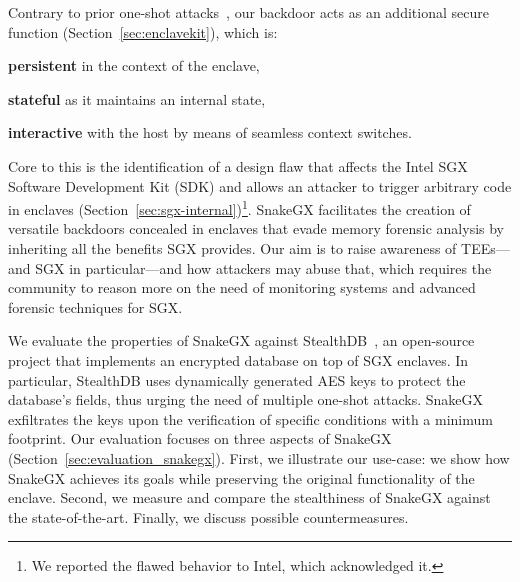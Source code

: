 Contrary to prior one-shot attacks~\cite{biondo2018guard,lee2017hacking}, our 
backdoor acts as an additional secure function (Section~\ref{sec:enclavekit}), 
which is: 
\begin{enumerate*}[label=(\roman*)]
	\item \textbf{persistent} in the context of the enclave,
	\item \textbf{stateful} as it maintains an internal state,
	\item \textbf{interactive} with the host by means of seamless context 
	switches.
\end{enumerate*}
Core to this is the identification of a design flaw that
affects the Intel SGX Software Development Kit (SDK) and allows an attacker to 
trigger arbitrary code in enclaves 
(Section~\ref{sec:sgx-internal})\footnote{We reported the flawed 
	behavior to Intel, which acknowledged it.}.
SnakeGX facilitates the creation of versatile backdoors concealed in
enclaves that evade memory forensic analysis by inheriting all the benefits SGX 
provides.
Our aim is to raise awareness of TEEs---and SGX in particular---and how 
attackers may abuse that, which requires the community to reason more on the 
need of monitoring systems and advanced forensic techniques for SGX.

We evaluate the properties of SnakeGX against StealthDB~\cite{stealthdb}, an
open-source project that implements an encrypted database on top of SGX 
enclaves.
In particular, StealthDB uses dynamically generated AES keys to protect the
database's fields, thus urging the need of multiple one-shot attacks.
SnakeGX exfiltrates the keys upon the verification of specific conditions 
with a minimum footprint.
Our evaluation focuses on three aspects of SnakeGX 
(Section~\ref{sec:evaluation_snakegx}).
First, we illustrate our use-case: we show how SnakeGX achieves its goals
while preserving the original functionality of the enclave.
Second, we measure and compare the stealthiness of SnakeGX against the 
state-of-the-art.
Finally, we discuss possible countermeasures.

